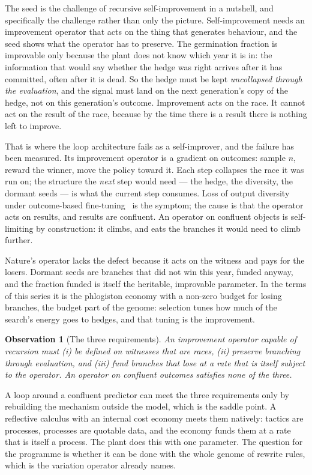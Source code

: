 \documentclass[11pt]{article}
\theoremstyle{plain}
\newtheorem{observation}[theorem]{Observation}
\theoremstyle{definition}
\theoremstyle{remark}
\begin{document}
The seed is the challenge of recursive self-improvement in a nutshell, and
specifically the challenge rather than only the picture. Self-improvement
needs an improvement operator that acts on the thing that generates
behaviour, and the seed shows what the operator has to preserve. The
germination fraction is improvable only because the plant does not know which
year it is in: the information that would say whether the hedge was right
arrives after it has committed, often after it is dead. So the hedge must be
kept \emph{uncollapsed through the evaluation}, and the signal must land on
the next generation's copy of the hedge, not on this generation's outcome.
Improvement acts on the race. It cannot act on the result of the race,
because by the time there is a result there is nothing left to improve.

That is where the loop architecture fails as a self-improver, and the failure
has been measured. Its improvement operator is a gradient on outcomes: sample
$n$, reward the winner, move the policy toward it. Each step collapses the
race it was run on; the structure the \emph{next} step would need --- the
hedge, the diversity, the dormant seeds --- is what the current step consumes.
Loss of output diversity under outcome-based fine-tuning~\cite{Kirk24} is the
symptom; the cause is that the operator acts on results, and results are
confluent. An operator on confluent objects is self-limiting by
construction: it climbs, and eats the branches it would need to climb
further.

Nature's operator lacks the defect because it acts on the witness and pays
for the losers. Dormant seeds are branches that did not win this year, funded
anyway, and the fraction funded is itself the heritable, improvable
parameter. In the terms of this series it is the phlogiston economy with a
non-zero budget for losing branches, the budget part of the genome:
selection tunes how much of the search's energy goes to hedges, and that
tuning is the improvement.

\begin{observation}[The three requirements]\label{obs:rsi}
An improvement operator capable of recursion must (i) be defined on witnesses
that are races, (ii) preserve branching through evaluation, and (iii) fund
branches that lose at a rate that is itself subject to the operator. An
operator on confluent outcomes satisfies none of the three.
\end{observation}

A loop around a confluent predictor can meet the three requirements only by
rebuilding the mechanism outside the model, which is the saddle point. A
reflective calculus with an internal cost economy meets them natively:
tactics are processes, processes are quotable data, and the economy funds
them at a rate that is itself a process. The plant does this with one
parameter. The question for the programme is whether it can be done with the
whole genome of rewrite rules, which is the variation operator
\cite{ProofSearch} already names.
\end{document}
